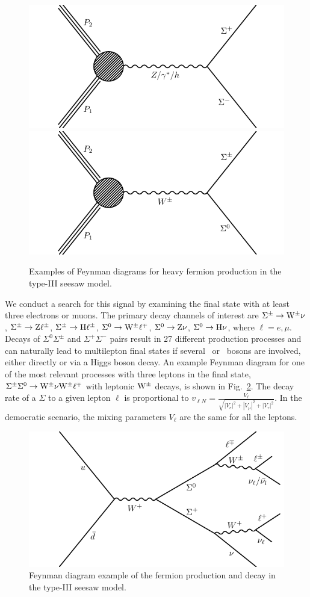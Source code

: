 \begin{figure}[b]
\begin{center}
	\includegraphics[width=.5\textwidth]{Introduction/SeesawProduction-SpSm}%
	\includegraphics[width=.5\textwidth]{Introduction/SeesawProduction-SpmS0}
	\caption{Examples of Feynman diagrams for heavy fermion production in the type-III seesaw model.
	\label{fig:SeesawProduction}}
\end{center}
\end{figure}

We conduct a search for this signal by examining the final state with at least three electrons or muons. The primary decay channels of interest are $\Sigma^\pm \to \mathrm{W}^\pm \nu$, $\Sigma^\pm \to \mathrm{Z} \ell^\pm$, $\Sigma^\pm \to \mathrm{H} \ell^\pm$, $\Sigma^0 \to \mathrm{W}^\pm \ell^\mp$, $\Sigma^0 \to \mathrm{Z} \nu$, $\Sigma^0 \to \mathrm{H} \nu$, where $\ell = e, \mu$. Decays of $\Sigma^0 \Sigma^\pm$ and $\Sigma^+ \Sigma^-$ pairs result in 27 different production processes and can naturally lead to multilepton final states if several \PW\ or \Z\ bosons are involved, either directly or via a Higgs boson decay. An example Feynman diagram for one of the most relevant processes with three leptons in the final state, $\Sigma^\pm \Sigma^0 \to \mathrm{W}^\pm \nu \mathrm{W}^\pm \ell^\mp$ with leptonic $\mathrm{W}^\pm$ decays, is shown in Fig.~\ref{fig:SeesawDecay}.
The decay rate of a $\Sigma$ to a given lepton $\ell$ is proportional to $v_{\ell N} = \frac{V_\ell}{\sqrt{|V_e|^2 + |V_\mu|^2 + |V_\tau|^2}}$. In the democratic scenario, the mixing parameters $V_\ell$ are the same for all the leptons.

\begin{figure}[t]
\begin{center}
	\includegraphics[width=.5\textwidth]{Introduction/Seesaw}
	\caption{Feynman diagram example of the fermion production and decay in the type-III seesaw model.
	\label{fig:SeesawDecay}}
\end{center}
\end{figure}

